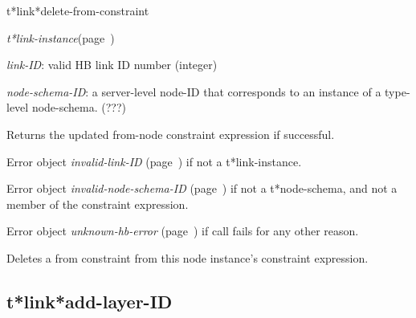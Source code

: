 \begin{description}
\item [Name:]  t*link*delete-from-constraint

\item [Class:] {\sl t*link-instance}\hfill(page~\pageref{t*link-instance})

\item [Parameters:]
\item {\sl link-ID}:  
valid HB link ID number (integer)

\item {\sl node-schema-ID}:  a server-level node-ID that corresponds to an 
instance of a type-level node-schema. (???)



\item [Return-value:]
Returns the updated from-node constraint expression
if successful.

Error object {\sl invalid-link-ID} (page~\pageref{invalid-link-ID}) if not a t*link-instance.

Error object {\sl invalid-node-schema-ID} (page~\pageref{invalid-node-schema-ID}) if not
a t*node-schema, and not a member of the constraint
expression.

Error object {\sl unknown-hb-error} (page~\pageref{unknown-hb-error}) if call fails for
any other reason.

\item [Description:]

Deletes a from constraint from this node instance's
constraint expression.

\item [Public:]



\end{description}
\horizontalline

\subsection{t*link*add-layer-ID}
\label{t*link*add-layer-ID}

